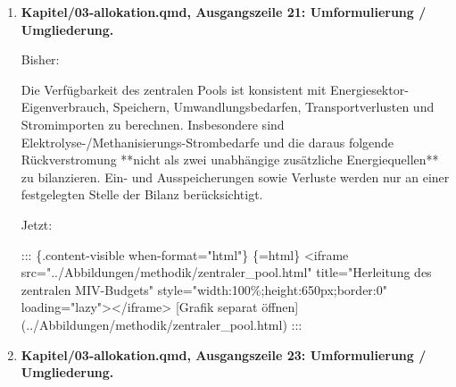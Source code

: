\documentclass[
  ngerman,
  a4paper,
  DIV=11]{scrreprt}
\newenvironment{Shaded}{\begin{snugshade}}{\end{snugshade}}
\newcommand{\NormalTok}[1]{\textcolor[rgb]{0.00,0.23,0.31}{#1}}
\begin{document}
\begin{enumerate}
  Jetzt:

\begin{Shaded}
\begin{Highlighting}[]
\NormalTok{Dem zentralen Pool werden Wasserkraft (173 PJ/a), Windkraft (105), Biomasse (21) und die normierte Position Geothermie/sonstige (4) zugeordnet: zusammen **303 PJ/a**. Wasserstoff{-}Rückverstromung (4 PJ/a) ist im Referenzfall wegen der nicht dokumentierten Herkunft nicht angerechnet; eine Variante zeigt die vollständige Anrechnung. Fossile Erzeugung (1 PJ/a) bleibt außerhalb des Pools [@uba2023transition, Tab. 16].}
\end{Highlighting}
\end{Shaded}
\item
  \textbf{Kapitel/03-allokation.qmd, Ausgangszeile 21: Umformulierung /
  Umgliederung.}

  Bisher:

\begin{Shaded}
\begin{Highlighting}[]
\NormalTok{Die Verfügbarkeit des zentralen Pools ist konsistent mit Energiesektor{-}Eigenverbrauch, Speichern, Umwandlungsbedarfen, Transportverlusten und Stromimporten zu berechnen. Insbesondere sind Elektrolyse{-}/Methanisierungs{-}Strombedarfe und die daraus folgende Rückverstromung **nicht als zwei unabhängige zusätzliche Energiequellen** zu bilanzieren. Ein{-} und Ausspeicherungen sowie Verluste werden nur an einer festgelegten Stelle der Bilanz berücksichtigt.}
\end{Highlighting}
\end{Shaded}

  Jetzt:

\begin{Shaded}
\begin{Highlighting}[]
\NormalTok{::: \{.content{-}visible when{-}format="html"\}}
\NormalTok{\textasciigrave{}\textasciigrave{}\textasciigrave{}\{=html\}}
\NormalTok{\textless{}iframe src="../Abbildungen/methodik/zentraler\_pool.html" title="Herleitung des zentralen MIV{-}Budgets" style="width:100\%;height:650px;border:0" loading="lazy"\textgreater{}\textless{}/iframe\textgreater{}}
\NormalTok{\textasciigrave{}\textasciigrave{}\textasciigrave{}}
\NormalTok{[Grafik separat öffnen](../Abbildungen/methodik/zentraler\_pool.html)}
\NormalTok{:::}
\end{Highlighting}
\end{Shaded}
\item
  \textbf{Kapitel/03-allokation.qmd, Ausgangszeile 23: Umformulierung /
  Umgliederung.}


\end{enumerate}
\end{document}
